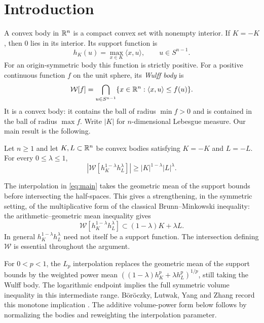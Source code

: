 \section{Introduction}
\label{sec:introduction}

A convex body in $\mathbb R^n$ is a compact convex set with nonempty interior.
If $K=-K$, then $0$ lies in its interior.
Its support function is
\[
 h_K(u)=\max_{x\in K}\langle x,u\rangle,\qquad u\in S^{n-1}.
\]
For an origin-symmetric body this function is strictly positive.
For a positive continuous function $f$ on the unit sphere, its
\emph{Wulff body} is
\[
 \mathcal W[f]=\bigcap_{u\in S^{n-1}}
 \{x\in\mathbb R^n:\langle x,u\rangle\le f(u)\}.
\]
It is a convex body: it contains the ball of radius $\min f>0$ and
is contained in the ball of radius $\max f$. Write $|K|$ for
$n$-dimensional Lebesgue measure. Our main result is the following.

\begin{theorem}
\label{thm:main}
Let $n\ge1$ and let $K,L\subset\mathbb R^n$ be convex bodies satisfying
$K=-K$ and $L=-L$. For every $0\le\lambda\le1$,
\begin{equation}\label{eq:main}
 \left|\mathcal W[h_K^{1-\lambda}h_L^\lambda]\right|
 \ge |K|^{1-\lambda}|L|^\lambda.
\end{equation}
\end{theorem}

The interpolation in \eqref{eq:main} takes the geometric mean of the
support bounds before intersecting the half-spaces. This gives a
strengthening, in the symmetric setting, of the multiplicative form
of the classical Brunn--Minkowski inequality: the arithmetic--geometric
mean inequality gives
\[
 \mathcal W[h_K^{1-\lambda}h_L^\lambda]
 \subset (1-\lambda)K+\lambda L.
\]
In general $h_K^{1-\lambda}h_L^\lambda$ need not itself be a support
function. The intersection defining $\mathcal W$ is essential throughout
the argument.

For $0<p<1$, the $L_p$ interpolation replaces the geometric mean of the
support bounds by the weighted power mean
$((1-\lambda)h_K^p+\lambda h_L^p)^{1/p}$, still taking the Wulff body.
The logarithmic endpoint implies the full symmetric volume inequality in
this intermediate range. B\"or\"oczky, Lutwak, Yang and Zhang record
this monotone implication
\cite[equation~(1.10) and the following paragraph, p.~1977]{BLZY2012}.
The additive
volume-power form below follows by normalizing the bodies and reweighting
the interpolation parameter.

